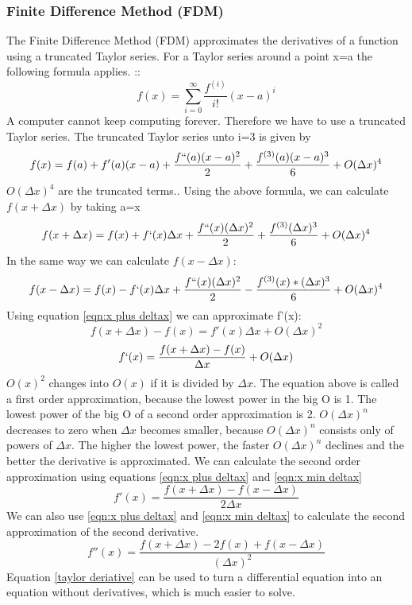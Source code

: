 \documentclass{article}
\begin{document}
\subsubsection{Finite Difference Method (FDM)}
The Finite Difference Method (FDM) approximates the derivatives of a function using a truncated Taylor series. For a Taylor series around a point x=a the following formula applies. :\cite{Taylor series}:
\[f(x)=\sum_{i=0}^{\infty}\frac{f^{(i)}}{i!}(x-a)^{i}\]
A computer cannot keep computing forever. Therefore we have to use a truncated Taylor series. The truncated Taylor series unto i=3 is given by \cite{Taylor series approximation}
\[f(x)=f(a)+f'(a)(x-a)+\frac{f``(a)(x-a)^{2}}{2} + \frac{f^{(3)}(a)(x-a)^{3}}{6}+O(\Delta x)^{4}\]
$O(\Delta x) ^{4}$ are the truncated terms.\cite{Big O}. Using the above formula, we can calculate $f(x+\Delta x)$ by taking a=x\cite{quantstart FDM}
\begin{equation}f(x+\Delta x)=f(x)+f`(x)\Delta x + \frac{f``(x) (\Delta x)^{2}}{2}+ \frac{f^{(3)} (\Delta x)^{3}}{6} + O(\Delta x)^{4}\label{eqn:x plus deltax}\end{equation}
In the same way we can calculate $f(x-\Delta x)$:
\begin{equation}f(x- \Delta x)=f(x)-f`(x)\Delta x + \frac{f``(x)(\Delta x)^{2}}{2}-\frac{f^{(3)}(x)*(\Delta x)^{3}}{6} + O(\Delta x) ^{4} \label{eqn:x min deltax}\end{equation}
Using equation \ref{eqn:x plus deltax} we can approximate f'(x):
\[f(x+\Delta x) -f(x) = f'(x)\Delta x + O(\Delta x)^{2}\]
\[f`(x)=\frac{f(x+\Delta x) - f(x)}{\Delta x} + O(\Delta x)\]
$O(x)^{2}$ changes into $O(x)$ if it is divided by $\Delta x $. The equation above is called a first order approximation, because the lowest power in the big O is 1. The lowest power of the big O of a second order approximation is 2. $O(\Delta x)^{n}$ decreases to zero when $\Delta x$ becomes smaller, because $O(\Delta x)^{n}$ consists only of powers of $\Delta x$. The higher the lowest power, the faster $O(\Delta x)^{n}$ declines and the better the derivative is approximated. We can calculate the second order approximation using equations \ref{eqn:x plus deltax} and \ref{eqn:x min deltax}
\begin{equation}f'(x)=\frac{f(x+\Delta x)-f(x-\Delta x)}{2\Delta x}\label{taylor deriative}\end{equation}
We can also use \ref{eqn:x plus deltax} and \ref{eqn:x min deltax} to calculate the second approximation of the second derivative.
\begin{equation}f''(x)=\frac{f(x+\Delta x)-2f(x)+f(x-\Delta x)}{(\Delta x)^{2}} \label{second derivative} \end{equation}
Equation \ref{taylor deriative} can be used to turn a differential equation into an equation without derivatives, which is much easier to solve.
\end{document}
